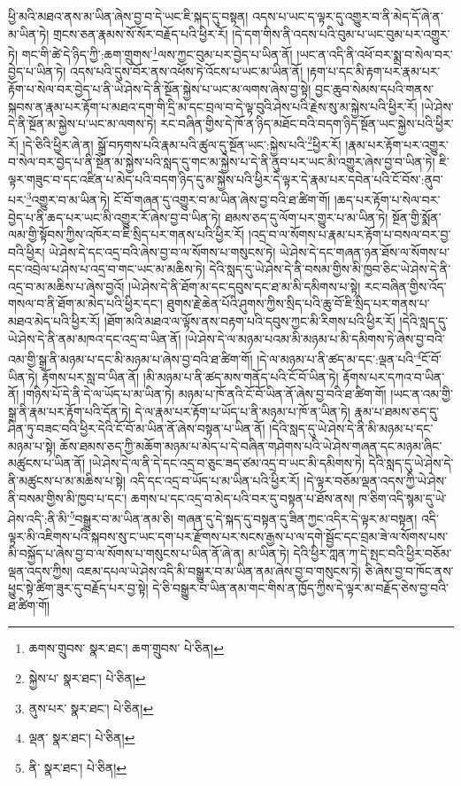 ཕྱི་མའི་མཐའ་ནས་མ་ཡིན་ཞེས་བྱ་བ་དེ་ཡང་ཇི་སྐད་དུ་བསྟན། འདས་པ་ཡང་ད་ལྟར་དུ་འགྱུར་བ་ནི་མེད་དོ་ཞེ་ན་མ་ཡིན་ཏེ། གྲངས་ཅན་རྣམས་སོ་སོར་བརྗོད་པའི་ཕྱིར་རོ། །དེ་དག་གིས་ནི་འདས་པའི་བུམ་པ་ཡང་བུམ་པར་འགྱུར་ཏེ། གང་གི་ཚེ་དེ་ཉིད་ཀྱི་:ཆག་གྲུགས་\footnote{ཆགས་གྲུབས་  སྣར་ཐང་། ཆག་གྲུབས་  པེ་ཅིན། }ལས་ཀྱང་བུམ་པར་བྱེད་པ་ཡིན་ནོ། །ཡང་ན་འདི་ནི་འཕོ་བར་སྨྲ་བ་སེལ་བར་བྱེད་པ་ཡིན་ཏེ། འདས་པའི་དུས་བོར་ནས་འཕོས་ཏེ་འོངས་པ་ཡང་མ་ཡིན་ནོ། །རྟག་པ་དང་མི་རྟག་པར་རྣམ་པར་རྟོག་པ་སེལ་བར་བྱེད་པ་ནི་ཡེ་ཤེས་དེ་ནི་སྔོན་སྐྱེས་པ་ཡང་མ་ལགས་ཞེས་བྱ་སྟེ། བྱང་ཆུབ་སེམས་དཔའི་གནས་སྐབས་ན་རྣམ་པར་རྟོག་པ་མཐའ་དག་གི་དྲི་མ་དང་བྲལ་བ་དེ་ལྟ་བུའི་ཤེས་པའི་རྗེས་སུ་མ་སྐྱེས་པའི་ཕྱིར་རོ། །ཡེ་ཤེས་དེ་ནི་སྔོན་མ་སྐྱེས་པ་ཡང་མ་ལགས་ཏེ། རང་བཞིན་གྱིས་དེ་ཁོ་ན་ཉིད་མཐོང་བའི་བདག་ཉིད་སྔོན་ཡང་སྐྱེས་པའི་ཕྱིར་རོ། །དེ་ཅིའི་ཕྱིར་ཞེ་ན། སྒྲོ་བཏགས་པའི་རྣམ་པའི་ཚུལ་དུ་སྔོན་ཡང་:སྐྱེས་པའི་\footnote{སྐྱེས་པ་  སྣར་ཐང་།  པེ་ཅིན། }ཕྱིར་རོ། །རྣམ་པར་རྟོག་པར་འགྱུར་བ་སེལ་བར་བྱེད་པ་ནི་སྔོན་མ་སྐྱེས་པའི་སླད་དུ་གང་མ་སྐྱེས་པ་དེ་ནི་ནུབ་པར་ཡང་མི་འགྱུར་ཞེས་བྱ་བ་ཡིན་ཏེ། ཇི་ལྟར་གཟུང་བ་དང་འཛིན་པ་མེད་པའི་བདག་ཉིད་དུ་མ་སྐྱེས་པའི་ཕྱིར་དེ་ལྟར་དེ་རྣམ་པར་དབེན་པའི་ངོ་བོས་:ནུབ་པར་\footnote{ནུས་པར་  སྣར་ཐང་།  པེ་ཅིན། }འགྱུར་བ་མ་ཡིན་ཏེ། ངོ་བོ་གཞན་དུ་འགྱུར་བ་མ་ཡིན་ཞེས་བྱ་བའི་ཐ་ཚིག་གོ། །ཆད་པར་རྟོག་པ་སེལ་བར་བྱེད་པ་ནི་ཆད་པར་ཡང་མི་འགྱུར་རོ་ཞེས་བྱ་བ་ཡིན་ཏེ། ཐམས་ཅད་དུ་ལོག་པར་གྱུར་པ་མ་ཡིན་ཏེ། སྔོན་གྱི་སྨོན་ལམ་གྱི་སྟོབས་ཀྱིས་འཁོར་བ་ཇི་སྲིད་པར་གནས་པའི་ཕྱིར་རོ། །འདྲ་བ་ལ་སོགས་པ་རྣམ་པར་རྟོག་པ་བསལ་བར་བྱ་བའི་ཕྱིར། ཡེ་ཤེས་དེ་དང་འདྲ་བའི་ཞེས་བྱ་བ་ལ་སོགས་པ་གསུངས་ཏེ། ཡེ་ཤེས་དེ་དང་གཞན་ཉན་ཐོས་ལ་སོགས་པ་དང་འབྲེལ་པ་ཤེས་པ་འདྲ་བ་གང་ཡང་མ་མཆིས་ཏེ། དེའི་སླད་དུ་ཡེ་ཤེས་དེ་ནི་བསམ་གྱིས་མི་ཁྱབ་ཅིང་ཡེ་ཤེས་དེ་ནི་འདྲ་བ་མ་མཆིས་པ་ཞེས་བྱའོ། །ཡེ་ཤེས་དེ་ནི་ཐོག་མ་དང་དབུས་དང་ཐ་མ་མི་དམིགས་པ་སྟེ། རང་བཞིན་གྱིས་འོད་གསལ་བ་ནི་ཐོག་མ་མེད་པའི་ཕྱིར་དང་། ཐུགས་རྗེ་ཆེན་པོའི་ཤུགས་ཀྱིས་སྲིད་པའི་ཆུ་བོ་ཇི་སྲིད་པར་གནས་པ་མཐའ་མེད་པའི་ཕྱིར་རོ། །ཐོག་མའི་མཐའ་ལ་ལྟོས་ནས་བརྟག་པའི་དབུས་ཀྱང་མི་རིགས་པའི་ཕྱིར་རོ། །དེའི་སླད་དུ་ཡེ་ཤེས་དེ་ནི་ནམ་མཁའ་དང་འདྲ་བ་ཡིན་ནོ། །ཡེ་ཤེས་དེ་ལ་མཉམ་པའམ་མི་མཉམ་པ་མི་དམིགས་ཏེ་ཞེས་བྱ་བའི་འམ་གྱི་སྒྲ་ནི་མཉམ་པ་དང་མི་མཉམ་པ་ཞེས་བྱ་བའི་ཐ་ཚིག་གོ། །དེ་ལ་མཉམ་པ་ནི་ཚད་མ་དང་:ལྡན་པའི་\footnote{ལྡན་  སྣར་ཐང་།  པེ་ཅིན། }ངོ་བོ་ཡིན་ཏེ། རྟོགས་པར་སླ་བ་ཡིན་ནོ། །མི་མཉམ་པ་ནི་ཚད་མས་གནོད་པའི་ངོ་བོ་ཡིན་ཏེ། རྟོགས་པར་དཀའ་བ་ཡིན་ནོ། །གཉིས་པོ་དེ་ནི་དེ་ལ་ཡོད་པ་མ་ཡིན་ཏེ། མཉམ་པ་ཁོ་ནའི་ངོ་བོ་ཡིན་ནོ་ཞེས་བྱ་བའི་ཐ་ཚིག་གོ། །ཡང་ན་འམ་གྱི་སྒྲ་ནི་རྣམ་པར་རྟོག་པའི་དོན་ཏེ། དེ་ལ་རྣམ་པར་རྟོག་པ་ཡོད་པ་ནི་མཉམ་པ་ཁོ་ན་ཡིན་ཏེ། རྣམ་པ་ཐམས་ཅད་དུ་ཤིན་ཏུ་བཟང་བའི་ཕྱིར་དེའི་ངོ་བོ་མ་ཡིན་ནོ་ཞེས་བསྟན་པ་ཡིན་ནོ། །དེའི་སླད་དུ་ཡེ་ཤེས་དེ་ནི་མི་མཉམ་པ་དང་མཉམ་པ་སྟེ། ཆོས་ཐམས་ཅད་ཀྱི་མཆོག་མཉམ་པ་མེད་པ་དེ་བཞིན་གཤེགས་པའི་ཡེ་ཤེས་གཞན་དང་མཉམ་ཞིང་མཚུངས་པ་ཡིན་ནོ། །ཡེ་ཤེས་དེ་ལ་ནི་དེ་དང་འདྲ་བ་ཅུང་ཟད་ཙམ་འདྲ་བ་ཡང་མི་དམིགས་ཏེ། དེའི་སླད་དུ་ཡེ་ཤེས་དེ་ནི་མཚུངས་པ་མ་མཆིས་པ་སྟེ། འདི་དང་འདྲ་བ་ཡོད་པ་མ་ཡིན་པའི་ཕྱིར་རོ། །དེ་ལྟར་བཅོམ་ལྡན་འདས་ཀྱི་ཡེ་ཤེས་ནི་བསམ་གྱིས་མི་ཁྱབ་པ་དང་། ཆགས་པ་དང་འདྲ་བ་མེད་པའི་བར་དུ་བསྟན་པ་ཐོས་ནས། ཁ་ཅིག་འདི་སྙམ་དུ་ཡེ་ཤེས་འདི་:ནི་མི་\footnote{ནི་  སྣར་ཐང་།  པེ་ཅིན། }བསྒྱུར་བ་མ་ཡིན་ནམ་ཅི། གཞན་དུ་དེ་སྐད་དུ་བསྟན་དུ་ཟིན་ཀྱང་འདིར་དེ་ལྟར་མ་བསྟན། འདི་ལྟར་མི་འཇིགས་པའི་སྐབས་སུ་ང་ཡང་དག་པར་རྫོགས་པར་སངས་རྒྱས་པ་ལ་དགེ་སྦྱོང་དང་བྲམ་ཟེ་ལ་སོགས་པས་མི་བསྐྱོད་པ་ཞེས་བྱ་བ་ལ་སོགས་པ་གསུངས་པ་ཡིན་ནོ་ཞེ་ན། མ་ཡིན་ཏེ། དེའི་ཕྱིར་ཀླན་ཀ་དེ་སྤང་བའི་ཕྱིར་བཅོམ་ལྡན་འདས་ཀྱིས། འཇམ་དཔལ་ཡེ་ཤེས་འདི་མི་བསྒྱུར་བ་མ་ཡིན་ནམ་ཞེས་བྱ་བ་གསུངས་ཏེ། ཅི་ཞེས་བྱ་བ་ཁོང་ནས་ཕྱུང་སྟེ་ཚིག་ཟུར་དུ་བརྗོད་པར་བྱ་སྟེ། དེ་ཅི་བསྒྱུར་བ་ཡིན་ནམ་གང་གིས་ན་ཁྱོད་ཀྱིས་དེ་ལྟར་མ་བརྗོད་ཅེས་བྱ་བའི་ཐ་ཚིག་གོ། 